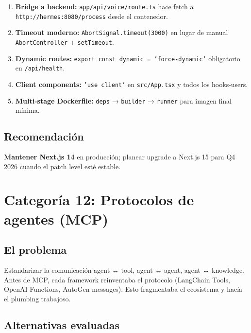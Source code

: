 \documentclass[11pt,a4paper]{article}
\begin{document}
\begin{enumerate}[leftmargin=*,itemsep=1pt]
\item \textbf{Bridge a backend:} \texttt{app/api/voice/route.ts} hace fetch a \texttt{http://hermes:8080/process} desde el contenedor.
\item \textbf{Timeout moderno:} \texttt{AbortSignal.timeout(3000)} en lugar de manual \texttt{AbortController} + \texttt{setTimeout}.
\item \textbf{Dynamic routes:} \texttt{export const dynamic = 'force-dynamic'} obligatorio en \texttt{/api/health}.
\item \textbf{Client components:} \texttt{'use client'} en \texttt{src/App.tsx} y todos los hooks-users.
\item \textbf{Multi-stage Dockerfile:} \texttt{deps} → \texttt{builder} → \texttt{runner} para imagen final mínima.
\end{enumerate}

\subsection{Recomendación}

\textbf{Mantener Next.js 14} en producción; planear upgrade a Next.js 15 para Q4 2026 cuando el patch level esté estable.

\newpage

\section{Categoría 12: Protocolos de agentes (MCP)}

\subsection{El problema}

Estandarizar la comunicación agent ↔ tool, agent ↔ agent, agent ↔ knowledge. Antes de MCP, cada framework reinventaba el protocolo (LangChain Tools, OpenAI Functions, AutoGen messages). Esto fragmentaba el ecosistema y hacía el plumbing trabajoso.

\subsection{Alternativas evaluadas}
\end{document}
